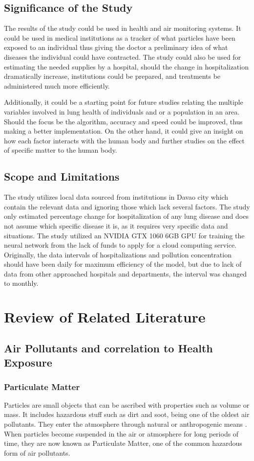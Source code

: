 \documentclass[10pt,11pt,12pt,oneside]{book}
\begin{document}
    \section{Significance of the Study}
    The results of the study could be used in health and air monitoring systems. It could be used in medical institutions as a tracker of what particles have been exposed to an individual thus giving the doctor a preliminary idea of what diseases the individual could have contracted. The study could also be used for estimating the needed supplies by a hospital, should the change in hospitalization dramatically increase, institutions could be prepared, and treatments be administered much more efficiently.
    
    Additionally, it could be a starting point for future studies relating the multiple variables involved in lung health of individuals and or a population in an area. Should the focus be the algorithm, accuracy and speed could be improved, thus making a better implementation. On the other hand, it could give an insight on how each factor interacts with the human body and further studies on the effect of specific matter to the human body.
    \section{Scope and Limitations}
    The study utilizes local data sourced from institutions in Davao city which contain the relevant data and ignoring those which lack several factors. The study only estimated percentage change for hospitalization of any lung disease and does not assume which specific disease it is, as it requires very specific data and situations. The study utilized an NVIDIA GTX 1060 6GB GPU for training the neural network from the lack of funds to apply for a cloud computing service.\\
    Originally, the data intervals of hospitalizations and pollution concentration should have been daily for maximum efficiency of the model, but due to lack of data from other approached hospitals and departments, the interval was changed to monthly.
\chapter{Review of Related Literature}
    \section{Air Pollutants and correlation to Health Exposure}
        \subsection{Particulate Matter}
        Particles are small objects that can be ascribed with properties such as volume or mass. It includes hazardous stuff such as dirt and soot, being one of the oldest air pollutants. They enter the atmosphere through natural or anthropogenic means \cite{knudsen2012particulate}. When particles become suspended in the air or atmosphere for long periods of time, they are now known as Particulate Matter, one of the common hazardous form of air pollutants. 
        
\end{document}
